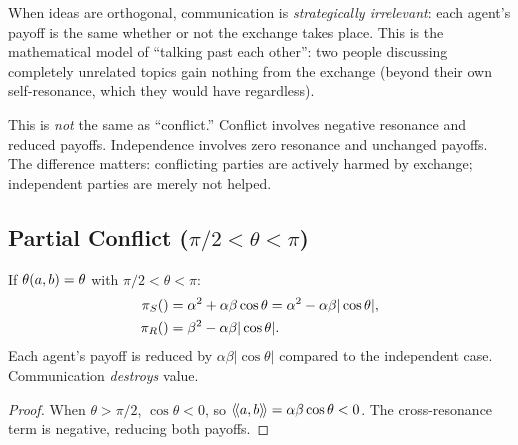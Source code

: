 \begin{interpretation}
\label{interp:independence}
When ideas are orthogonal, communication is \emph{strategically irrelevant}:
each agent's payoff is the same whether or not the exchange takes place. This
is the mathematical model of ``talking past each other'': two people discussing
completely unrelated topics gain nothing from the exchange (beyond their own
self-resonance, which they would have regardless).

This is \emph{not} the same as ``conflict.'' Conflict involves negative
resonance and reduced payoffs. Independence involves zero resonance and
unchanged payoffs. The difference matters: conflicting parties are actively
harmed by exchange; independent parties are merely not helped.
\end{interpretation}


\subsection{Partial Conflict ($\pi/2 < \theta < \pi$)}

\begin{proposition}
\label{prop:partial-conflict}
If $\theta(a,b) = \theta$ with $\pi/2 < \theta < \pi$:
\begin{align*}
  \pi_{S}() &= \alpha^2 + \alpha\beta\cos\theta
  = \alpha^2 - \alpha\beta|\cos\theta|, \\
  \pi_{R}() &= \beta^2 - \alpha\beta|\cos\theta|.
\end{align*}
Each agent's payoff is reduced by $\alpha\beta|\cos\theta|$ compared to the
independent case. Communication \emph{destroys} value.
\end{proposition}

\begin{proof}
When $\theta > \pi/2$, $\cos\theta < 0$, so $\langle\!\langle a, b \rangle\!\rangle = \alpha\beta\cos\theta
< 0$. The cross-resonance term is negative, reducing both payoffs.
\end{proof}

